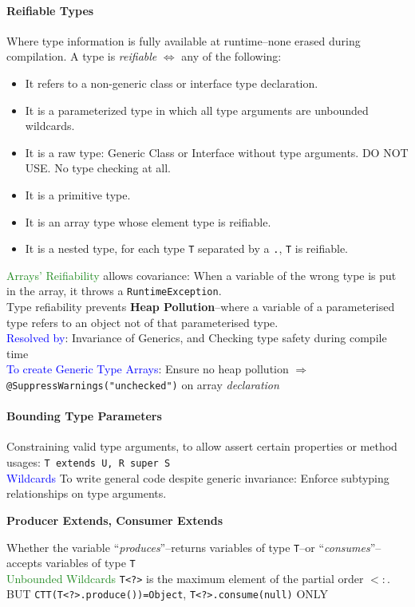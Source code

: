 \paragraph{Reifiable Types}
Where type information is fully available at runtime–none erased during
compilation. A
type is \emph{reifiable} $\iff$ any of the following:
\begin{itemize}
  \item It refers to a non-generic class or interface type declaration.
  \item It is a parameterized type in which all type arguments are unbounded wildcards.
  \item It is a raw type: Generic Class or Interface without type arguments.
    \textcolor{Bittersweet}{DO NOT USE\@. No type checking at all.}
  \item It is a primitive type.
  \item It is an array type whose element type is reifiable.
  \item It is a nested type, for each type \verb$T$ separated by a \verb$.$, \verb$T$ is reifiable.
\end{itemize}
\textcolor{ForestGreen}{Arrays' Reifiability} allows covariance: When a
variable of the wrong type is put in the array, it throws a
\verb$RuntimeException$. \\
Type refiability prevents \textcolor{Bittersweet}{\textbf{Heap
Pollution}}–where a variable of a parameterised type refers to an object not of
that parameterised type.\\
\textcolor{Blue}{Resolved by}: Invariance of Generics, and Checking type safety during compile time\\
\textcolor{Blue}{To create Generic Type Arrays}: Ensure no heap pollution $\Rightarrow$
\verb$@SuppressWarnings("unchecked")$ on array \emph{declaration}
\paragraph{Bounding Type Parameters}
Constraining valid type arguments, to allow assert certain properties or method
usages: \verb|T extends U, R super S|\\
\textcolor{Blue}{Wildcards} To write general code despite generic invariance:
Enforce subtyping relationships on type arguments.\\
\begin{center}\vspace{-3mm}\textcolor{Bittersweet}{\textbf{Producer Extends,
Consumer Extends}}\end{center}
Whether the variable ``\emph{produces}''–returns variables of type \verb|T|–or
``\emph{consumes}''–accepts variables of type \verb|T|\\
\textcolor{ForestGreen}{Unbounded Wildcards} \verb$T<?>$ is the maximum element
of the partial order $<\colon$. BUT \verb$CTT(T<?>.produce())=Object$, \verb$T<?>.consume(null)$ ONLY
